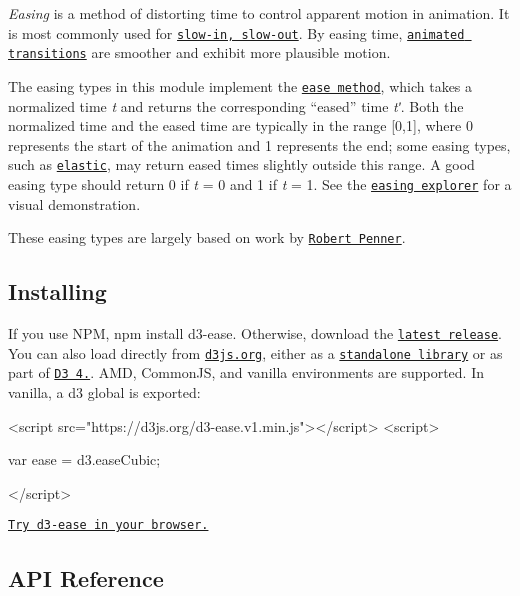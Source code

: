 {\itshape Easing} is a method of distorting time to control apparent motion in animation. It is most commonly used for \href{https://en.wikipedia.org/wiki/12_basic_principles_of_animation#Slow_In_and_Slow_Out}{\tt slow-\/in, slow-\/out}. By easing time, \href{https://github.com/d3/d3-transition}{\tt animated transitions} are smoother and exhibit more plausible motion.

The easing types in this module implement the \href{#ease_ease}{\tt ease method}, which takes a normalized time {\itshape t} and returns the corresponding “eased” time {\itshape tʹ}. Both the normalized time and the eased time are typically in the range \mbox{[}0,1\mbox{]}, where 0 represents the start of the animation and 1 represents the end; some easing types, such as \href{#easeElastic}{\tt elastic}, may return eased times slightly outside this range. A good easing type should return 0 if {\itshape t} = 0 and 1 if {\itshape t} = 1. See the \href{http://bl.ocks.org/mbostock/248bac3b8e354a9103c4}{\tt easing explorer} for a visual demonstration.

These easing types are largely based on work by \href{http://robertpenner.com/easing/}{\tt Robert Penner}.

\subsection*{Installing}

If you use N\+PM, {\ttfamily npm install d3-\/ease}. Otherwise, download the \href{https://github.com/d3/d3-ease/releases/latest}{\tt latest release}. You can also load directly from \href{https://d3js.org}{\tt d3js.\+org}, either as a \href{https://d3js.org/d3-ease.v1.min.js}{\tt standalone library} or as part of \href{https://github.com/d3/d3}{\tt D3 4.}. A\+MD, Common\+JS, and vanilla environments are supported. In vanilla, a {\ttfamily d3} global is exported\+:


\begin{DoxyCode}
<script src="https://d3js.org/d3-ease.v1.min.js"></script>
<script>

var ease = d3.easeCubic;

</script>
\end{DoxyCode}


\href{https://tonicdev.com/npm/d3-ease}{\tt Try d3-\/ease in your browser.}

\subsection*{A\+PI Reference}

